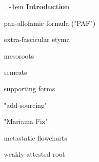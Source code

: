 {\large \parindent=-1em \textbf{Introduction}}
\vspace{0.25em}

pan-allofamic formula ("PAF")

extra-fascicular etyma

mesoroots

semcats

supporting forms

"add-sourcing"

"Mariama Fix"

metastatic flowcharts

weakly-attested root
